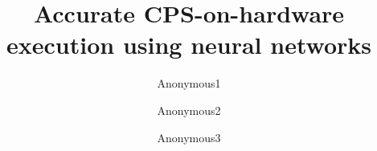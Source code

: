 \documentclass[sigconf]{acmart}
\newcommand\ignore[1]{}
\begin{document}
\title{ Accurate CPS-on-hardware execution using neural networks }

\author{Anonymous1}
\affiliation{}
\author{Anonymous2}
\affiliation{}
\author{Anonymous3}
\affiliation{}

\ignore{
\author{Anonymous}
\affiliation{%
	\institution{The University of Auckland}
	\city{Auckland} 
	\state{New Zealand} 
}

\author{Anonymous}
\affiliation{%
	\institution{The University of Auckland}
	\city{Auckland} 
	\state{New Zealand} 
}

\author{Anonymous}
\affiliation{%
	\institution{The University of Auckland}
	\city{Auckland} 
	\state{New Zealand} 
}
}

\renewcommand{\shortauthors}{he}


\begin{abstract}

\end{abstract}

%
%

\maketitle

	


 
\end{document}
